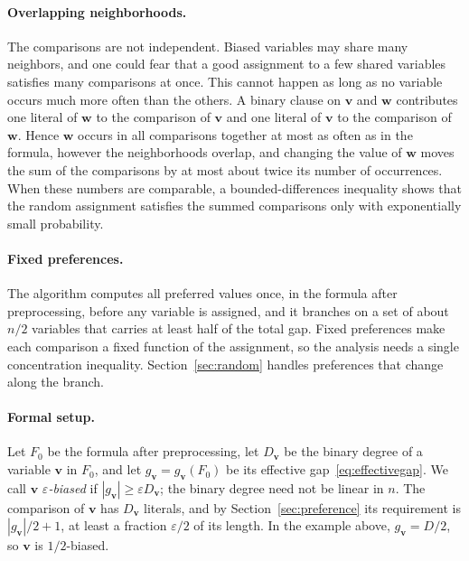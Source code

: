 \documentclass[11pt,a4paper]{article}
\theoremstyle{definition}
\theoremstyle{remark}
\begin{document}
\paragraph{Overlapping neighborhoods.}
The comparisons are not independent. Biased variables may share many
neighbors, and one could fear that a good assignment to a few shared
variables satisfies many comparisons at once. This cannot happen as long as
no variable occurs much more often than the others. A binary clause on
$\mathbf v$ and $\mathbf w$ contributes one literal of $\mathbf w$ to the
comparison of $\mathbf v$ and one literal of $\mathbf v$ to the comparison
of $\mathbf w$. Hence $\mathbf w$ occurs in all comparisons together at most
as often as in the formula, however the neighborhoods overlap, and changing
the value of $\mathbf w$ moves the sum of the comparisons by at most about
twice its number of occurrences. When these numbers are comparable, a
bounded-differences inequality shows that the random assignment satisfies
the summed comparisons only with exponentially small probability.

\paragraph{Fixed preferences.}
The algorithm computes all preferred values once, in the formula after
preprocessing, before any variable is assigned, and it branches on a set
of about $n/2$ variables that carries at least half of the total gap.
Fixed preferences make each comparison a fixed function of the assignment,
so the analysis needs a single concentration inequality.
Section~\ref{sec:random} handles preferences that change along the branch.

\paragraph{Formal setup.}
Let $F_0$ be the formula after preprocessing, let $D_{\mathbf v}$ be the
binary degree of a variable $\mathbf v$ in $F_0$, and let
$g_{\mathbf v}=g_{\mathbf v}(F_0)$ be its effective
gap~\eqref{eq:effectivegap}. We call $\mathbf v$
\emph{$\varepsilon$-biased} if $|g_{\mathbf v}|\ge\varepsilon D_{\mathbf v}$;
the binary degree need not be linear in $n$. The comparison of $\mathbf v$
has $D_{\mathbf v}$ literals, and by Section~\ref{sec:preference} its
requirement is $|g_{\mathbf v}|/2+1$, at least a fraction $\varepsilon/2$ of
its length. In the example above, $g_{\mathbf v}=D/2$, so $\mathbf v$ is
$1/2$-biased.
\end{document}
